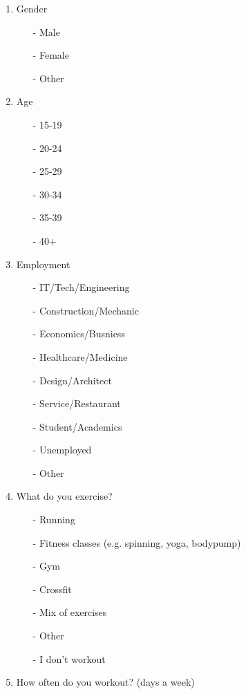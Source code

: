 \documentclass[a4paper]{article}
\begin{document}
\begin{enumerate}  
\item Gender
	\begin{itemize}
	      \item[-]{Male}
      	  \item[-]{Female}
          \item[-]{Other}
	\end{itemize}
\item Age
	\begin{itemize}
	      \item[-]{15-19}
          \item[-]{20-24}
          \item[-]{25-29}
          \item[-]{30-34}
          \item[-]{35-39}
          \item[-]{40+}
	\end{itemize}
\item Employment
	\begin{itemize}
	      \item[-]{IT/Tech/Engineering}
          \item[-]{Construction/Mechanic}
          \item[-]{Economics/Busniess}
          \item[-]{Healthcare/Medicine}
          \item[-]{Design/Architect}
          \item[-]{Service/Restaurant}
          \item[-]{Student/Academics}
          \item[-]{Unemployed}
          \item[-]{Other}
	\end{itemize}
\item What do you exercise?
	\begin{itemize}
          \item[-]{Running}
          \item[-]{Fitness classes (e.g. spinning, yoga,
bodypump)}
          \item[-]{Gym}
          \item[-]{Crossfit}
          \item[-]{Mix of exercises}
          \item[-]{Other}
	      \item[-]{I don't workout}
	\end{itemize}
\item How often do you workout? (days a week)

\end{enumerate}
\end{document}
